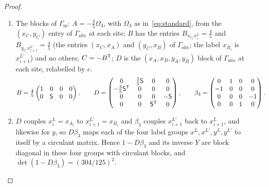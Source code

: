 \begin{proof}
\begin{enumerate}
\item[(a)] The blocks of $\Gamma_{\mathrm{in}}$: $A=-\tfrac35\Omega_3$, with $\Omega_3$ as in~\eqref{eq:standard}, from the
$(x_C,y_C)$ entry of $\Gamma_{\mathrm{site}}$ at each site; $B$ has the entries
$B_{x_{C_i}x^{L}_i}=\tfrac45$ and $B_{y_{C_i}x^{L'}_{i+1}}=\tfrac45$ (the entries
$(x_C,x_A)$ and $(y_C,x_B)$ of $\Gamma_{\mathrm{site}}$; the label $x_{B_i}$ is
$x^{L'}_{i+1}$) and no others; $C=-B^{\mathsf T}$; $D$ is the $(x_A,x_B,y_A,y_B)$ block of
$\Gamma_{\mathrm{site}}$ at each site, relabelled by $e$. 
\[
 B=\tfrac45\begin{pmatrix}1&0&0&0\\0&\mathsf S&0&0\end{pmatrix},\qquad
 D=\begin{pmatrix}0&\tfrac35\mathsf S&0&0\\-\tfrac35\mathsf S^{\mathsf T}&0&0&0\\0&0&0&-\mathsf S\\0&0&\mathsf S^{\mathsf T}&0\end{pmatrix},\qquad
 \beta_3=\begin{pmatrix}0&1&0&0\\-1&0&0&0\\0&0&0&-1\\0&0&1&0\end{pmatrix}.
\]
\item[(b)] $D$ couples $x^{L}_i=x_{A_i}$ to $x^{L'}_{i+1}=x_{B_i}$ and $\beta_3$ couples
$x^{L'}_{i+1}$ back to $x^{L}_{i+1}$, and likewise for $y$, so $D\beta_3$ maps each of the
four label groups $x^{L},x^{L'},y^{L},y^{L'}$ to itself by a circulant matrix. Hence
$1-D\beta_3$ and its inverse $Y$ are block diagonal in these four groups with circulant
blocks, and $\det(1-D\beta_3)=(304/125)^2$. 
\end{enumerate}
\end{proof}
